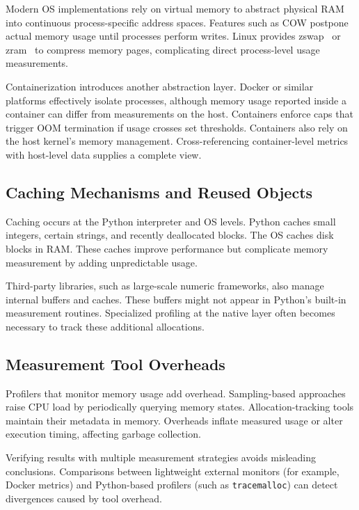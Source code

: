 Modern \ac{OS} implementations rely on virtual memory to abstract physical RAM into continuous process-specific address spaces.
Features such as \ac{COW} postpone actual memory usage until processes perform writes.
Linux provides zswap~\cite{zswap} or zram~\cite{zram} to compress memory pages, complicating direct process-level usage measurements.

Containerization introduces another abstraction layer.
Docker or similar platforms effectively isolate processes, although memory usage reported inside a container can differ from measurements on the host.
Containers enforce caps that trigger \ac{OOM} termination if usage crosses set thresholds.
Containers also rely on the host kernel's memory management.
Cross-referencing container-level metrics with host-level data supplies a complete view.

\subsection{Caching Mechanisms and Reused Objects}
\label{subsec:appendix-caching}

Caching occurs at the Python interpreter and \ac{OS} levels.
Python caches small integers, certain strings, and recently deallocated blocks.
The \ac{OS} caches disk blocks in \ac{RAM}.
These caches improve performance but complicate memory measurement by adding unpredictable usage.

Third-party libraries, such as large-scale numeric frameworks, also manage internal buffers and caches.
These buffers might not appear in Python's built-in measurement routines.
Specialized profiling at the native layer often becomes necessary to track these additional allocations.

\subsection{Measurement Tool Overheads}
\label{subsec:appendix-measurement-tool-overheads}

Profilers that monitor memory usage add overhead.
Sampling-based approaches raise \ac{CPU} load by periodically querying memory states.
Allocation-tracking tools maintain their metadata in memory.
Overheads inflate measured usage or alter execution timing, affecting garbage collection.

Verifying results with multiple measurement strategies avoids misleading conclusions.
Comparisons between lightweight external monitors (for example, Docker metrics) and Python-based profilers (such as \texttt{tracemalloc}) can detect divergences caused by tool overhead.


